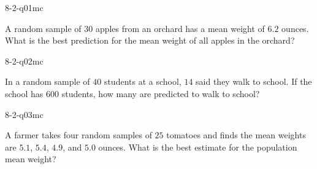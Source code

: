 

\begin{practiceQuestion}{8-2-q01}{mc}
\begin{questionText}
A random sample of $30$ apples from an orchard has a mean weight of $6.2$ ounces. What is the best prediction for the mean weight of all apples in the orchard?
\end{questionText}
\end{practiceQuestion}

\begin{practiceQuestion}{8-2-q02}{mc}
\begin{questionText}
In a random sample of $40$ students at a school, $14$ said they walk to school. If the school has $600$ students, how many are predicted to walk to school?
\end{questionText}
\end{practiceQuestion}

\begin{practiceQuestion}{8-2-q03}{mc}
\begin{questionText}
A farmer takes four random samples of $25$ tomatoes and finds the mean weights are $5.1$, $5.4$, $4.9$, and $5.0$ ounces. What is the best estimate for the population mean weight?
\end{questionText}
\end{practiceQuestion}

